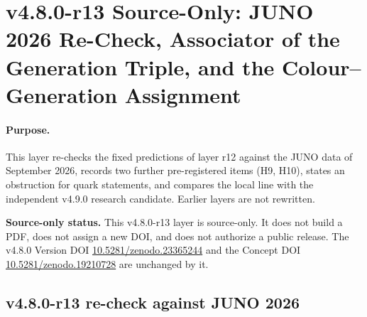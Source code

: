 
\clearpage
\section*{v4.8.0-r13 Source-Only: JUNO 2026 Re-Check, Associator of the Generation Triple, and the Colour--Generation Assignment}
\label{sec:v480-r13-juno-associator-colour}

\paragraph{Purpose.}
This layer re-checks the fixed predictions of layer r12 against the JUNO data of September 2026, records two
further pre-registered items (H9, H10), states an obstruction for quark statements, and compares the local
line with the independent v4.9.0 research candidate.  Earlier layers are not rewritten.

\noindent\textbf{Source-only status.}
This v4.8.0-r13 layer is source-only.  It does not build a PDF, does not assign a new DOI,
and does not authorize a public release.  The v4.8.0 Version DOI
\href{https://doi.org/10.5281/zenodo.23365244}{10.5281/zenodo.23365244} and the Concept DOI
\href{https://doi.org/10.5281/zenodo.19210728}{10.5281/zenodo.19210728} are unchanged by it.

\subsection*{v4.8.0-r13 re-check against JUNO 2026}
\label{subsec:v480-r13-juno}


